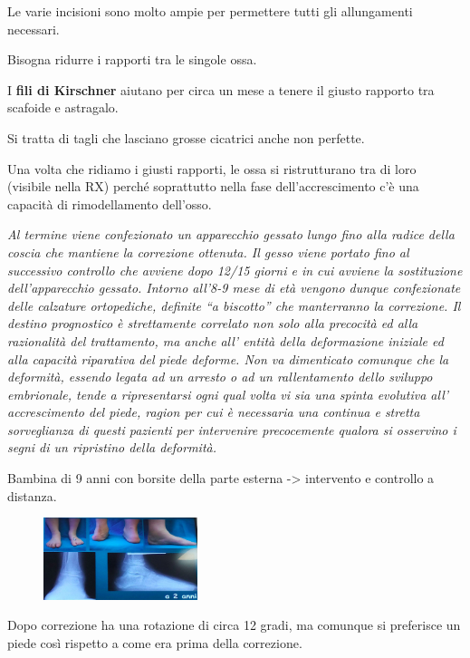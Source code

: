 \begin{itemize}
Le varie incisioni sono molto ampie per permettere tutti gli allungamenti necessari.

Bisogna ridurre i rapporti tra le singole ossa.

I \textbf{fili di Kirschner} aiutano per circa un mese a tenere il giusto rapporto tra scafoide e astragalo.

Si tratta di tagli che lasciano grosse cicatrici anche non perfette.

Una volta che ridiamo i giusti rapporti, le ossa si ristrutturano tra di loro (visibile nella RX) perché soprattutto nella fase dell'accrescimento c'è una capacità di rimodellamento dell'osso.

\emph{Al termine viene confezionato un apparecchio gessato lungo fino alla radice della coscia che mantiene la correzione ottenuta. Il gesso viene portato fino al successivo controllo che avviene dopo 12/15 giorni e in cui avviene la sostituzione dell'apparecchio gessato. Intorno all'8-9 mese di età vengono dunque confezionate delle calzature ortopediche, definite ``a biscotto'' che manterranno la correzione. Il destino prognostico è strettamente correlato non solo alla precocità ed alla razionalità del trattamento, ma anche all' entità della
deformazione iniziale ed alla capacità riparativa del piede deforme. Non va dimenticato comunque che la deformità, essendo legata ad un arresto o ad un rallentamento dello sviluppo embrionale, tende a ripresentarsi ogni qual volta vi sia una spinta evolutiva all' accrescimento del piede, ragion per cui è necessaria una continua e stretta sorveglianza di questi pazienti per intervenire precocemente qualora si osservino i segni di un ripristino della deformità.}

Bambina di 9 anni con borsite della parte esterna -> intervento e controllo a distanza.

\begin{figure}[!ht]
\centering
\includegraphics[width=0.4\textwidth]{016/image32.png}
\end{figure}

Dopo correzione ha una rotazione di circa 12 gradi, ma comunque si preferisce un piede così rispetto a come era prima della correzione.


\end{itemize}
